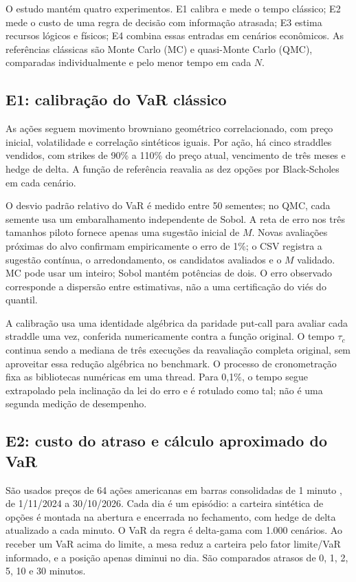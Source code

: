 \documentclass[conference,a4paper]{IEEEtran}
\begin{document}
O estudo mantém quatro experimentos. E1 calibra e mede o tempo clássico; E2 mede o custo de uma regra de decisão com informação atrasada; E3 estima recursos lógicos e físicos; E4 combina essas entradas em cenários econômicos. As referências clássicas são Monte Carlo (MC) e quasi-Monte Carlo (QMC), comparadas individualmente e pelo menor tempo em cada \(N\).

\subsection{E1: calibração do VaR clássico}\label{e1-calibrauxe7uxe3o-do-var-cluxe1ssico}

As ações seguem movimento browniano geométrico correlacionado, com preço inicial, volatilidade e correlação sintéticos iguais. Por ação, há cinco straddles vendidos, com strikes de 90\% a 110\% do preço atual, vencimento de três meses e hedge de delta. A função de referência reavalia as dez opções por Black-Scholes em cada cenário.

O desvio padrão relativo do VaR é medido entre 50 sementes; no QMC, cada semente usa um embaralhamento independente de Sobol. A reta de erro nos três tamanhos piloto fornece apenas uma sugestão inicial de \(M\). Novas avaliações próximas do alvo confirmam empiricamente o erro de 1\%; o CSV registra a sugestão contínua, o arredondamento, os candidatos avaliados e o \(M\) validado. MC pode usar um inteiro; Sobol mantém potências de dois. O erro observado corresponde a dispersão entre estimativas, não a uma certificação do viés do quantil.

A calibração usa uma identidade algébrica da paridade put-call para avaliar cada straddle uma vez, conferida numericamente contra a função original. O tempo \(\tau_c\) continua sendo a mediana de três execuções da reavaliação completa original, sem aproveitar essa redução algébrica no benchmark. O processo de cronometração fixa as bibliotecas numéricas em uma thread. Para 0,1\%, o tempo segue extrapolado pela inclinação da lei do erro e é rotulado como tal; não é uma segunda medição de desempenho.

\subsection{E2: custo do atraso e cálculo aproximado do VaR}\label{e2-custo-do-atraso-e-cuxe1lculo-aproximado-do-var}

São usados preços de 64 ações americanas em barras consolidadas de 1 minuto \cite{alpaca2026marketdata}, de 1/11/2024 a 30/10/2026. Cada dia é um episódio: a carteira sintética de opções é montada na abertura e encerrada no fechamento, com hedge de delta atualizado a cada minuto. O VaR da regra é delta-gama com 1.000 cenários. Ao receber um VaR acima do limite, a mesa reduz a carteira pelo fator limite/VaR informado, e a posição apenas diminui no dia. São comparados atrasos de 0, 1, 2, 5, 10 e 30 minutos.
\end{document}
